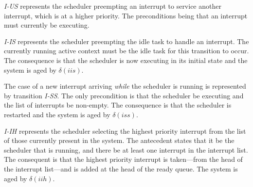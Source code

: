 
\emph{I-US} represents the scheduler preempting an interrupt to
service another interrupt, which is at a higher priority. The
preconditions being that an interrupt must currently be executing.

\emph{I-IS} represents the scheduler preempting the idle task to
handle an interrupt. The currently running active context must be the
idle task for this transition to occur. The consequence is that the
scheduler is now executing in its initial state and the system is aged
by $\delta(iis)$.


The case of a new interrupt arriving \emph{while} the scheduler is
running is represented by transition \emph{I-SS}. The only
precondition is that the scheduler be executing and the list of
interrupts be non-empty. The consequence is that the scheduler is
restarted and the system is aged by $\delta(iss)$.


\emph{I-IH} represents the scheduler selecting the highest priority
interrupt from the list of those currently present in the system. The
antecedent states that it be the scheduler that is running, and there
be at least one interrupt in the interrupt list. The consequent is
that the highest priority interrupt is taken---from the head of the
interrupt list---and is added at the head of the ready queue. The
system is aged by $\delta(iih)$.


